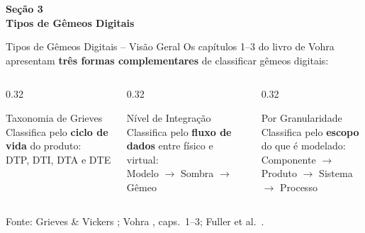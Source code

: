 \documentclass[aspectratio=169,xcolor=dvipsnames]{beamer}
\begin{document}
\begin{frame}[plain]
    \vfill
    \centering
    {\Large\textcolor{dexpiBlue}{\textbf{Seção 3}}}\\[0.8em]
    {\LARGE\textbf{Tipos de Gêmeos Digitais}}\\[0.6em]
    \vfill
\end{frame}

\begin{frame}{Tipos de Gêmeos Digitais -- Visão Geral}
    Os capítulos 1--3 do livro de Vohra \cite{vohra2022dt} apresentam \textbf{três formas complementares} de classificar gêmeos digitais:

    \vspace{0.6em}
    \begin{columns}[T]
        \begin{column}{0.32\textwidth}
            \begin{block}{Taxonomia de Grieves}
                Classifica pelo \textbf{ciclo de vida} do produto:\\[0.3em]
                DTP, DTI, DTA e DTE
            \end{block}
        \end{column}
        \begin{column}{0.32\textwidth}
            \begin{block}{Nível de Integração}
                Classifica pelo \textbf{fluxo de dados} entre físico e virtual:\\[0.3em]
                Modelo $\to$ Sombra $\to$ Gêmeo
            \end{block}
        \end{column}
         \begin{column}{0.32\textwidth}
            \begin{block}{Por Granularidade}
                Classifica pelo \textbf{escopo} do que é modelado:\\[0.3em]
                Componente $\to$ Produto $\to$ Sistema $\to$ Processo
            \end{block}
        \end{column}
    \end{columns}

    \vspace{0.6em}
    \footnotesize
    Fonte: Grieves \& Vickers \cite{grieves2017dt}; Vohra \cite{vohra2022dt}, caps.\ 1--3; Fuller et al.\ \cite{fuller2020dt}.
\end{frame}
\end{document}
